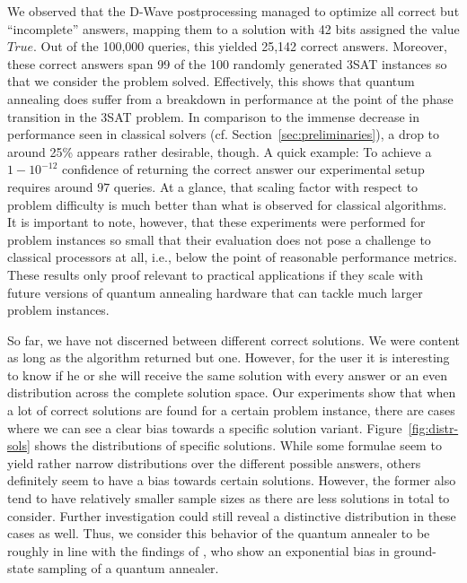 We observed that the D-Wave postprocessing managed to optimize all correct but ``incomplete'' answers, mapping them to a solution with 42 bits assigned the value $\textit{True}$. Out of the 100,000 queries, this yielded 25,142 correct answers. Moreover, these correct answers span 99 of the 100 randomly generated 3SAT instances so that we consider the problem solved. Effectively, this shows that quantum annealing does suffer from a breakdown in performance at the point of the phase transition in the 3SAT problem. In comparison to the immense decrease in performance seen in classical solvers (cf. Section~\ref{sec:preliminaries}), a drop to around 25\% appears rather desirable, though. A quick example: To achieve a $1 - 10^{-12}$ confidence of returning the correct answer our experimental setup requires around $97$ queries. At a glance, that scaling factor with respect to problem difficulty is much better than what is observed for classical algorithms. It is important to note, however, that these experiments were performed for problem instances so small that their evaluation does not pose a challenge to classical processors at all, i.e., below the point of reasonable performance metrics. These results only proof relevant to practical applications if they scale with future versions of quantum annealing hardware that can tackle much larger problem instances.

So far, we have not discerned between different correct solutions. We were content as long as the algorithm returned but one. However, for the user it is interesting to know if he or she will receive the same solution with every answer or an even distribution across the complete solution space. Our experiments show that when a lot of correct solutions are found for a certain problem instance, there are cases where we can see a clear bias towards a specific solution variant. Figure~\ref{fig:distr-sols} shows the distributions of specific solutions. While some formulae seem to yield rather narrow distributions over the different possible answers, others definitely seem to have a bias towards certain solutions. However, the former also tend to have relatively smaller sample sizes as there are less solutions in total to consider. Further investigation could still reveal a distinctive distribution in these cases as well. Thus, we consider this behavior of the quantum annealer to be roughly in line with the findings of \cite{mandra2017exponentially}, who show an exponential bias in ground-state sampling of a quantum annealer.

